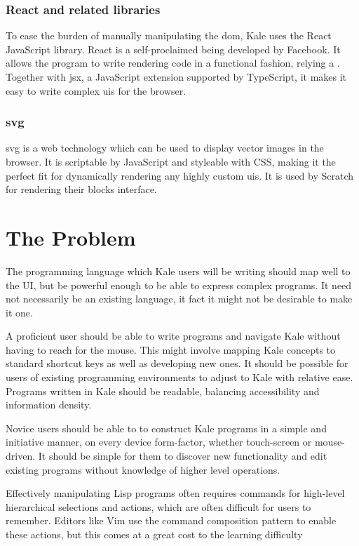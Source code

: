 \documentclass[11pt]{report}
\begin{document}
\subsection{React and related libraries}
To ease the burden of manually manipulating the \ac{dom}, Kale uses the React
\cite{React} JavaScript library. React is a self-proclaimed  being developed by Facebook. It
allows the program to write rendering
code in a functional fashion, relying a . Together with \ac{jsx}, a JavaScript extension supported by
TypeScript, it makes it easy to write complex \acp{ui} for the browser.

\subsection{\acf{svg}}
\ac{svg} is a web technology which can be used to display vector images in the
browser. It is scriptable by JavaScript and styleable with CSS, making it the
perfect fit for dynamically rendering any highly custom \acp{ui}. It is used by
Scratch for rendering their blocks interface.

\chapter{The Problem}

The programming language which Kale users will be writing should map well to
the UI, but be powerful enough to be able to express complex programs. It need
not necessarily be an existing language, it fact it might not be desirable to
make it one.

A proficient user should be able to write programs and navigate Kale without
having to reach for the mouse. This might involve mapping Kale concepts to
standard shortcut keys as well as developing new ones. It should be possible
for users of existing programming environments to adjust to Kale with relative
ease. Programs written in Kale should be readable, balancing accessibility and
information density.

Novice users should be able to to construct Kale programs in a simple and
initiative manner, on every device form-factor, whether touch-screen or
mouse-driven. It should be simple for them to discover new functionality and
edit existing programs without knowledge of higher level operations.

Effectively manipulating Lisp programs often requires commands for high-level
hierarchical selections and actions, which are often difficult for users to
remember. Editors like Vim use the command composition
pattern to enable these actions, but this comes at a great cost to the learning
difficulty \cite{Chodarev2016}
\end{document}
